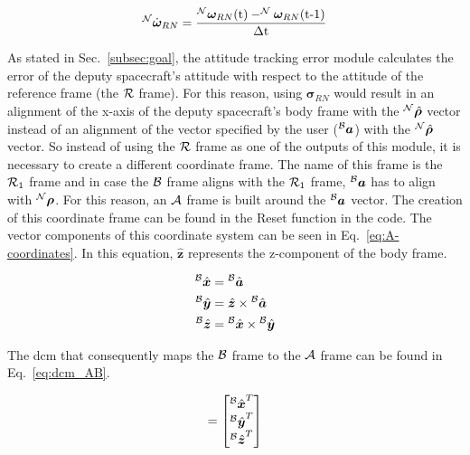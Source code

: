 \begin{equation}
    ^{\cal N}\dot{\bm \omega}_{RN} = \frac{^{\cal N}{\bm \omega}_{RN}(\textrm{t}) - ^{\cal N}{\bm \omega}_{RN}(\textrm{t-1})}{\Delta \textrm{t}}
    \label{eq:domega}
\end{equation}

As stated in Sec.~\ref{subsec:goal}, the attitude tracking error module calculates the error of the deputy spacecraft's attitude with respect to the attitude of the reference frame (the ${\cal R}$ frame). For this reason, using ${\bm \sigma}_{RN}$ would result in an alignment of the x-axis of the deputy spacecraft's body frame with the $^{\cal N}\hat{{\bm \rho}}$ vector instead of an alignment of the vector specified by the user ($^{\cal B}{\bm a}$) with the $^{\cal N}\hat{{\bm \rho}}$ vector. So instead of using the ${\cal R}$ frame as one of the outputs of this module, it is necessary to create a different coordinate frame. The name of this frame is the ${\cal R}_{1}$ frame and in case the ${\cal B}$ frame aligns with the ${\cal R}_{1}$ frame, $^{\cal B}{\bm a}$ has to align with $^{\cal N}{\bm \rho}$. For this reason, an ${\cal A}$ frame is built around the $^{\cal B}{\bm a}$ vector. The creation of this coordinate frame can be found in the Reset function in the code. The vector components of this coordinate system can be seen in Eq.~\eqref{eq:A-coordinates}. In this equation, ${\hat{\bm z}}$ represents the z-component of the body frame.

\begin{equation}
    \begin{split}
    {^{\cal B}\hat{{\bm x}}} &= {^{\cal B}\hat{{\bm a}}} \\
    {^{\cal B}\hat{{\bm y}}} &= {\hat{\bm z}} \times {^{\cal B}\hat{{\bm a}}} \\
    {^{\cal B}\hat{{\bm z}}} &= {^{\cal B}\hat{{\bm x}}} \times {^{\cal B}\hat{{\bm y}}}
    \end{split}
    \label{eq:A-coordinates}
\end{equation}

The dcm that consequently maps the ${\cal B}$ frame to the ${\cal A}$ frame can be found in Eq.~\eqref{eq:dcm_AB}.

\begin{equation}
    [AB] = \begin{bmatrix}
            {^{\cal B}\hat{{\bm x}}}^{T}\\ 
            {^{\cal B}\hat{{\bm y}}}^{T}\\ 
            {^{\cal B}\hat{{\bm z}}}^{T}
            \end{bmatrix}
            \label{eq:dcm_AB}
\end{equation}


